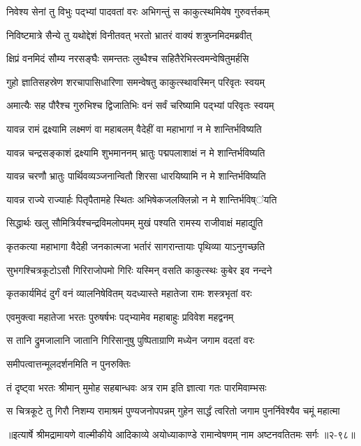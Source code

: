 
\twolineshloka
{निवेश्य सेनां तु विभुः पद्भ्यां पादवतां वरः}
{अभिगन्तुं स काकुत्स्थमियेष गुरुवर्त्तकम्} %

\twolineshloka
{निविष्टमात्रे सैन्ये तु यथोद्देशं विनीतवत्}
{भरतो भ्रातरं वाक्यं शत्रुघ्नमिदमब्रवीत्} %

\twolineshloka
{क्षिप्रं वनमिदं सौम्य नरसङ्घैः समन्ततः}
{लुब्धैश्च सहितैरेभिस्त्वमन्वेषितुमर्हसि} %

\twolineshloka
{गुहो ज्ञातिसहस्रेण शरचापासिधारिणा}
{समन्वेषतु काकुत्स्थावस्मिन् परिवृतः स्वयम्} %

\twolineshloka
{अमात्यैः सह पौरैश्च गुरुभिश्च द्विजातिभिः}
{वनं सर्वं चरिष्यामि पद्भ्यां परिवृतः स्वयम्} %

\twolineshloka
{यावन्न रामं द्रक्ष्यामि लक्ष्मणं वा महाबलम्}
{वैदेहीं वा महाभागां न मे शान्तिर्भविष्यति} %

\twolineshloka
{यावन्न चन्द्रसङ्काशं द्रक्ष्यामि शुभमाननम्}
{भ्रातुः पद्मपलाशाक्षं न मे शान्तिर्भविष्यति} %

\twolineshloka
{यावन्न चरणौ भ्रातुः पार्थिवव्यञ्जनान्वितौ}
{शिरसा धारयिष्यामि न मे शान्तिर्भविष्यति} %

\twolineshloka
{यावन्न राज्ये राज्यार्हः पितृपैतामहे स्थितः}
{अभिषेकजलक्लिन्नो न मे शान्तिर्भविष्ऺयति} %

\twolineshloka
{सिद्धार्थः खलु सौमित्रिर्यश्चन्द्रविमलोपमम्}
{मुखं पश्यति रामस्य राजीवाक्षं महाद्युति} %

\twolineshloka
{कृतकत्या महाभागा वैदेही जनकात्मजा}
{भर्तारं सागरान्तायाः पृथिव्या याऽनुगच्छति} %

\twolineshloka
{सुभगश्चित्रकूटोऽसौ गिरिराजोपमो गिरिः}
{यस्मिन् वसति काकुत्स्थः कुबेर इव नन्दने} %

\twolineshloka
{कृतकार्यमिदं दुर्गं वनं व्यालनिषेवितम्}
{यदध्यास्ते महातेजा रामः शस्त्रभृतां वरः} %

\twolineshloka
{एवमुक्त्वा महातेजा भरतः पुरुषर्षभः}
{पद्भ्यामेव महाबाहुः प्रविवेश महद्वनम्} %

\twolineshloka
{स तानि द्रुमजालानि जातानि गिरिसानुषु}
{पुष्पिताग्राणि मध्येन जगाम वदतां वरः} %

\onelineshloka
{समीपत्वात्तन्मूलदर्शनमिति न पुनरुक्तिः} %

\twolineshloka
{तं दृष्ट्वा भरतः श्रीमान् मुमोह सहबान्धवः}
{अत्र राम इति ज्ञात्वा गतः पारमिवाम्भसः} %

\twolineshloka
{स चित्रकूटे तु गिरौ निशम्य रामाश्रमं पुण्यजनोपपन्नम्}
{गुहेन सार्द्धं त्वरितो जगाम पुनर्निवेश्यैव चमूं महात्मा} %


॥इत्यार्षे श्रीमद्रामायणे वाल्मीकीये आदिकाव्ये अयोध्याकाण्डे रामान्वेषणम् नाम अष्टनवतितमः सर्गः ॥२-९८॥
